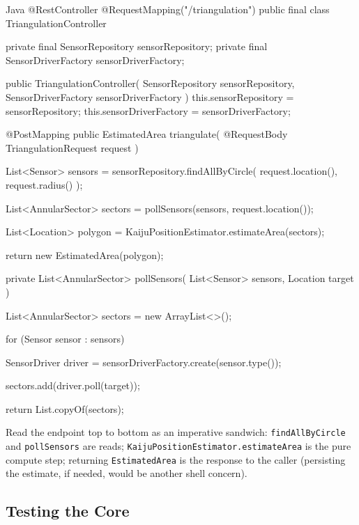 \begin{ridercode}{Java}
@RestController
@RequestMapping("/triangulation")
public final class TriangulationController
{
    private final SensorRepository sensorRepository;
    private final SensorDriverFactory sensorDriverFactory;

    public TriangulationController(
        SensorRepository sensorRepository,
        SensorDriverFactory sensorDriverFactory
    )
    {
        this.sensorRepository = sensorRepository;
        this.sensorDriverFactory = sensorDriverFactory;
    }

    @PostMapping
    public EstimatedArea triangulate(
        @RequestBody TriangulationRequest request
    )
    {
        List<Sensor> sensors =
            sensorRepository.findAllByCircle(
                request.location(),
                request.radius()
            );

        List<AnnularSector> sectors =
            pollSensors(sensors, request.location());

        List<Location> polygon =
            KaijuPositionEstimator.estimateArea(sectors);

        return new EstimatedArea(polygon);
    }

    private List<AnnularSector> pollSensors(
        List<Sensor> sensors,
        Location target
    )
    {
        List<AnnularSector> sectors = new ArrayList<>();

        for (Sensor sensor : sensors)
        {
            SensorDriver driver =
                sensorDriverFactory.create(sensor.type());

            sectors.add(driver.poll(target));
        }

        return List.copyOf(sectors);
    }
}
\end{ridercode}
\label{lst:fcis-triangulate-shell}

Read the endpoint top to bottom as an imperative sandwich: \texttt{findAllByCircle} and \texttt{pollSensors} are reads; \texttt{KaijuPositionEstimator.estimateArea} is the pure compute step; returning \texttt{EstimatedArea} is the response to the caller (persisting the estimate, if needed, would be another shell concern).

\subsection{Testing the Core}
\label{sec:fcis_triangulation_test}

